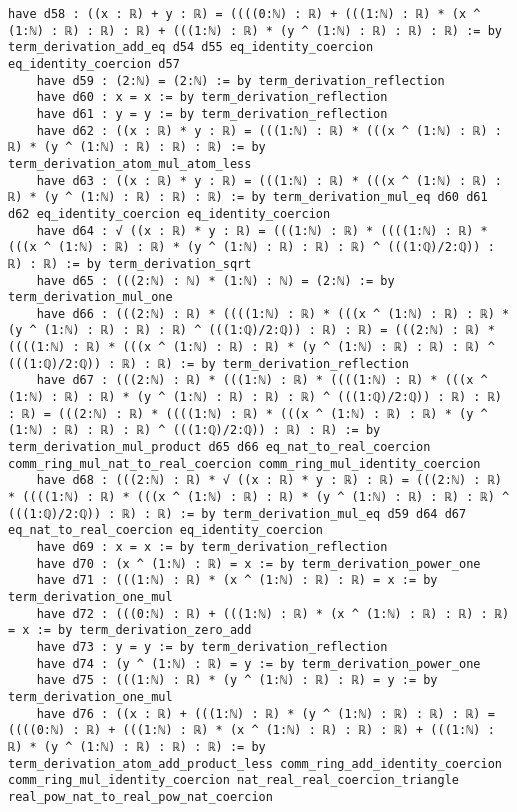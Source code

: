 \documentclass{article}
\begin{document}
\begin{tcolorbox}[colback=white!10, width=\linewidth]
\begin{lstlisting}[language=Lean4]
    have d58 : ((x : ℝ) + y : ℝ) = ((((0:ℕ) : ℝ) + (((1:ℕ) : ℝ) * (x ^ (1:ℕ) : ℝ) : ℝ) : ℝ) + (((1:ℕ) : ℝ) * (y ^ (1:ℕ) : ℝ) : ℝ) : ℝ) := by term_derivation_add_eq d54 d55 eq_identity_coercion eq_identity_coercion d57
    have d59 : (2:ℕ) = (2:ℕ) := by term_derivation_reflection
    have d60 : x = x := by term_derivation_reflection
    have d61 : y = y := by term_derivation_reflection
    have d62 : ((x : ℝ) * y : ℝ) = (((1:ℕ) : ℝ) * (((x ^ (1:ℕ) : ℝ) : ℝ) * (y ^ (1:ℕ) : ℝ) : ℝ) : ℝ) := by term_derivation_atom_mul_atom_less
    have d63 : ((x : ℝ) * y : ℝ) = (((1:ℕ) : ℝ) * (((x ^ (1:ℕ) : ℝ) : ℝ) * (y ^ (1:ℕ) : ℝ) : ℝ) : ℝ) := by term_derivation_mul_eq d60 d61 d62 eq_identity_coercion eq_identity_coercion
    have d64 : √ ((x : ℝ) * y : ℝ) = (((1:ℕ) : ℝ) * ((((1:ℕ) : ℝ) * (((x ^ (1:ℕ) : ℝ) : ℝ) * (y ^ (1:ℕ) : ℝ) : ℝ) : ℝ) ^ (((1:ℚ)/2:ℚ)) : ℝ) : ℝ) := by term_derivation_sqrt
    have d65 : (((2:ℕ) : ℕ) * (1:ℕ) : ℕ) = (2:ℕ) := by term_derivation_mul_one
    have d66 : (((2:ℕ) : ℝ) * ((((1:ℕ) : ℝ) * (((x ^ (1:ℕ) : ℝ) : ℝ) * (y ^ (1:ℕ) : ℝ) : ℝ) : ℝ) ^ (((1:ℚ)/2:ℚ)) : ℝ) : ℝ) = (((2:ℕ) : ℝ) * ((((1:ℕ) : ℝ) * (((x ^ (1:ℕ) : ℝ) : ℝ) * (y ^ (1:ℕ) : ℝ) : ℝ) : ℝ) ^ (((1:ℚ)/2:ℚ)) : ℝ) : ℝ) := by term_derivation_reflection
    have d67 : (((2:ℕ) : ℝ) * (((1:ℕ) : ℝ) * ((((1:ℕ) : ℝ) * (((x ^ (1:ℕ) : ℝ) : ℝ) * (y ^ (1:ℕ) : ℝ) : ℝ) : ℝ) ^ (((1:ℚ)/2:ℚ)) : ℝ) : ℝ) : ℝ) = (((2:ℕ) : ℝ) * ((((1:ℕ) : ℝ) * (((x ^ (1:ℕ) : ℝ) : ℝ) * (y ^ (1:ℕ) : ℝ) : ℝ) : ℝ) ^ (((1:ℚ)/2:ℚ)) : ℝ) : ℝ) := by term_derivation_mul_product d65 d66 eq_nat_to_real_coercion comm_ring_mul_nat_to_real_coercion comm_ring_mul_identity_coercion
    have d68 : (((2:ℕ) : ℝ) * √ ((x : ℝ) * y : ℝ) : ℝ) = (((2:ℕ) : ℝ) * ((((1:ℕ) : ℝ) * (((x ^ (1:ℕ) : ℝ) : ℝ) * (y ^ (1:ℕ) : ℝ) : ℝ) : ℝ) ^ (((1:ℚ)/2:ℚ)) : ℝ) : ℝ) := by term_derivation_mul_eq d59 d64 d67 eq_nat_to_real_coercion eq_identity_coercion
    have d69 : x = x := by term_derivation_reflection
    have d70 : (x ^ (1:ℕ) : ℝ) = x := by term_derivation_power_one
    have d71 : (((1:ℕ) : ℝ) * (x ^ (1:ℕ) : ℝ) : ℝ) = x := by term_derivation_one_mul
    have d72 : (((0:ℕ) : ℝ) + (((1:ℕ) : ℝ) * (x ^ (1:ℕ) : ℝ) : ℝ) : ℝ) = x := by term_derivation_zero_add
    have d73 : y = y := by term_derivation_reflection
    have d74 : (y ^ (1:ℕ) : ℝ) = y := by term_derivation_power_one
    have d75 : (((1:ℕ) : ℝ) * (y ^ (1:ℕ) : ℝ) : ℝ) = y := by term_derivation_one_mul
    have d76 : ((x : ℝ) + (((1:ℕ) : ℝ) * (y ^ (1:ℕ) : ℝ) : ℝ) : ℝ) = ((((0:ℕ) : ℝ) + (((1:ℕ) : ℝ) * (x ^ (1:ℕ) : ℝ) : ℝ) : ℝ) + (((1:ℕ) : ℝ) * (y ^ (1:ℕ) : ℝ) : ℝ) : ℝ) := by term_derivation_atom_add_product_less comm_ring_add_identity_coercion comm_ring_mul_identity_coercion nat_real_real_coercion_triangle real_pow_nat_to_real_pow_nat_coercion

\end{lstlisting}
\end{tcolorbox}
\end{document}
